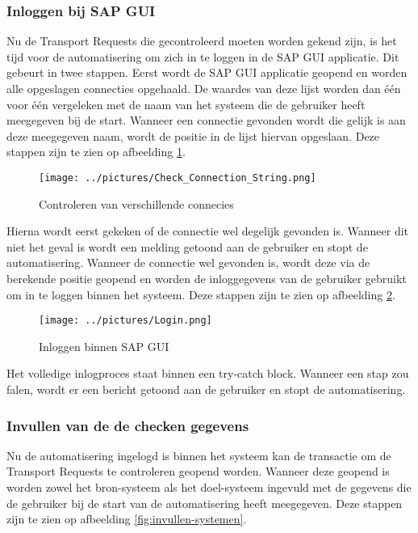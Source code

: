 \subsubsection{Inloggen bij SAP GUI}
\label{subsubsec:inloggen-sap-gui}

Nu de Transport Requests die gecontroleerd moeten worden gekend zijn, is het tijd voor de automatisering om zich in te loggen in de SAP GUI applicatie. Dit gebeurt in twee stappen. Eerst wordt de SAP GUI applicatie geopend en worden alle opgeslagen connecties opgehaald. De waardes van deze lijst worden dan één voor één vergeleken met de naam van het systeem die de gebruiker heeft meegegeven bij de start. Wanneer een connectie gevonden wordt die gelijk is aan deze meegegeven naam, wordt de positie in de lijst hiervan opgeslaan.
Deze stappen zijn te zien op afbeelding \ref{fig:controleren-connection-string}.

\begin{figure}
    \centering
    \texttt{[image: ../pictures/Check\_Connection\_String.png]}
    \caption{Controleren van verschillende connecies}
    \label{fig:controleren-connection-string}
\end{figure}

Hierna wordt eerst gekeken of de connectie wel degelijk gevonden is. Wanneer dit niet het geval is wordt een melding getoond aan de gebruiker en stopt de automatisering.
Wanneer de connectie wel gevonden is, wordt deze via de berekende positie geopend en worden de inloggegevens van de gebruiker gebruikt om in te loggen binnen het systeem.
Deze stappen zijn te zien op afbeelding \ref{fig:inloggen-sap-gui}.

\begin{figure}
    \centering
    \texttt{[image: ../pictures/Login.png]}
    \caption{Inloggen binnen SAP GUI}
    \label{fig:inloggen-sap-gui}
\end{figure}

Het volledige inlogproces staat binnen een try-catch block. Wanneer een stap zou falen, wordt er een bericht getoond aan de gebruiker en stopt de automatisering.

\subsubsection{Invullen van de de checken gegevens}
\label{subsubsec:invullen-checken-gegevens}

Nu de automatisering ingelogd is binnen het systeem kan de transactie om de Transport Requests te controleren geopend worden.
Wanneer deze geopend is worden zowel het bron-systeem als het doel-systeem ingevuld met de gegevens die de gebruiker bij de start van de automatisering heeft meegegeven.
Deze stappen zijn te zien op afbeelding \ref{fig:invullen-systemen}.

